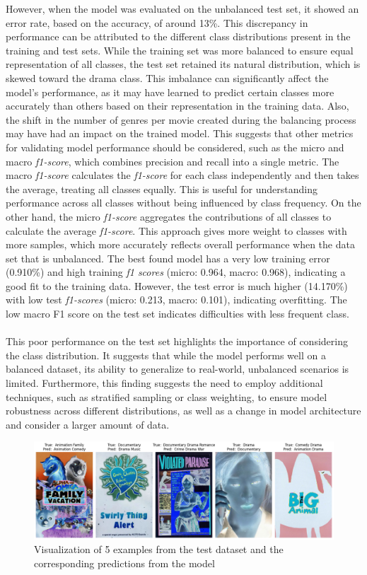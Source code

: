 \documentclass[a4paper, 11pt]{article}
\begin{document}
    However, when the model was evaluated on the unbalanced test set, it showed an error rate, based on the accuracy, of around 13\%. This discrepancy in performance can be attributed to the different class distributions present in the training and test sets. While the training set was more balanced to ensure equal representation of all classes, the test set retained its natural distribution, which is skewed toward the drama class. This imbalance can significantly affect the model's performance, as it may have learned to predict certain classes more accurately than others based on their representation in the training data. Also, the shift in the number of genres per movie created during the balancing process may have had an impact on the trained model. This suggests that other metrics for validating model performance should be considered, such as the micro and macro \textit{f1-score}, which combines precision and recall into a single metric. The macro \textit{f1-score} calculates the \textit{f1-score} for each class independently and then takes the average, treating all classes equally. This is useful for understanding performance across all classes without being influenced by class frequency. On the other hand, the micro \textit{f1-score} aggregates the contributions of all classes to calculate the average \textit{f1-score}. This approach gives more weight to classes with more samples, which more accurately reflects overall performance when the data set that is unbalanced. The best found model has a very low training error (0.910\%) and high training \textit{f1 scores} (micro: 0.964, macro: 0.968), indicating a good fit to the training data. However, the test error is much higher (14.170\%) with low test \textit{f1-scores} (micro: 0.213, macro: 0.101), indicating overfitting. The low macro F1 score on the test set indicates difficulties with less frequent class.\\\\
    This poor performance on the test set highlights the importance of considering the class distribution. It suggests that while the model performs well on a balanced dataset, its ability to generalize to real-world, unbalanced scenarios is limited. Furthermore, this finding suggests the need to employ additional techniques, such as stratified sampling or class weighting, to ensure model robustness across different distributions, as well as a change in model architecture and consider a larger amount of data.
    \begin{figure}[h!]
        \includegraphics[width=\linewidth]{imgs/prediction_visualisation.png}
        \caption{Visualization of 5 examples from the test dataset and the corresponding predictions from the model}
        \label{fig:visualisationPrediction}
    \end{figure}\\
\end{document}
